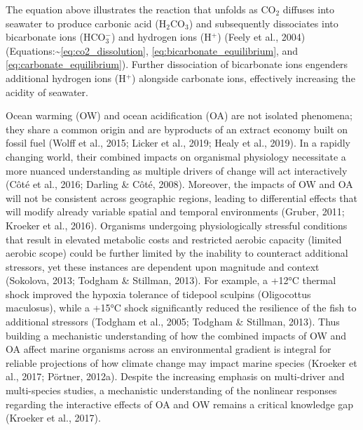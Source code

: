 \documentclass{CSUNthesis}
\begin{document}
The equation above illustrates the reaction that unfolds as CO\(_2\) diffuses into seawater to produce carbonic acid (H\(_2\)CO\(_3\)) and subsequently dissociates into bicarbonate ions (HCO\(_3^-\)) and hydrogen ions (H\(^+\)) (Feely et al., 2004)(Equations:\textasciitilde{}\ref{eq:co2_dissolution}, \ref{eq:bicarbonate_equilibrium}, and \ref{eq:carbonate_equilibrium}). Further dissociation of bicarbonate ions engenders additional hydrogen ions (H\(^+\)) alongside carbonate ions, effectively increasing the acidity of seawater.

Ocean warming (OW) and ocean acidification (OA) are not isolated phenomena; they share a common origin and are byproducts of an extract economy built on fossil fuel (Wolff et al., 2015; Licker et al., 2019; Healy et al., 2019). In a rapidly changing world, their combined impacts on organismal physiology necessitate a more nuanced understanding as multiple drivers of change will act interactively (Côté et al., 2016; Darling \& Côté, 2008). Moreover, the impacts of OW and OA will not be consistent across geographic regions, leading to differential effects that will modify already variable spatial and temporal environments (Gruber, 2011; Kroeker et al., 2016). Organisms undergoing physiologically stressful conditions that result in elevated metabolic costs and restricted aerobic capacity (limited aerobic scope) could be further limited by the inability to counteract additional stressors, yet these instances are dependent upon magnitude and context (Sokolova, 2013; Todgham \& Stillman, 2013). For example, a +12°C thermal shock improved the hypoxia tolerance of tidepool sculpins (Oligocottus maculosus), while a +15°C shock significantly reduced the resilience of the fish to additional stressors (Todgham et al., 2005; Todgham \& Stillman, 2013). Thus building a mechanistic understanding of how the combined impacts of OW and OA affect marine organisms across an environmental gradient is integral for reliable projections of how climate change may impact marine species (Kroeker et al., 2017; Pörtner, 2012a). Despite the increasing emphasis on multi-driver and multi-species studies, a mechanistic understanding of the nonlinear responses regarding the interactive effects of OA and OW remains a critical knowledge gap (Kroeker et al., 2017).
\end{document}
